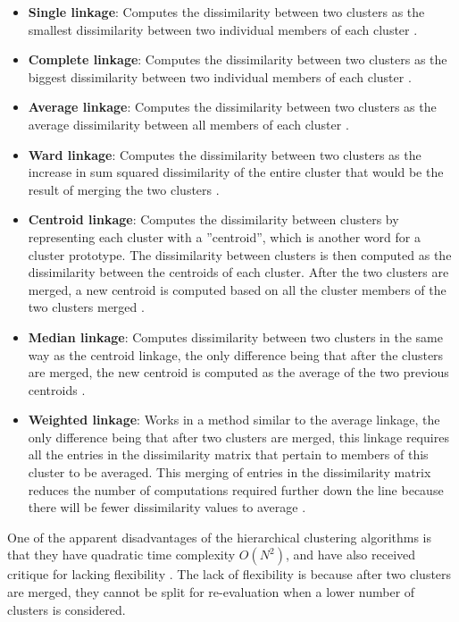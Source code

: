\begin{itemize}
    \item \textbf{Single linkage}: Computes the dissimilarity between two clusters as the smallest dissimilarity between two individual members of each cluster \cite{dependency_tsc_energy_markets}.
    \item \textbf{Complete linkage}: Computes the dissimilarity between two clusters as the biggest dissimilarity between two individual members of each cluster \cite{financial_tsc_variance_ratio}.
    \item \textbf{Average linkage}: Computes the dissimilarity between two clusters as the average dissimilarity between all members of each cluster \cite{dependency_tsc_energy_markets}.
    \item \textbf{Ward linkage}: Computes the dissimilarity between two clusters as the increase in sum squared dissimilarity of the entire cluster that would be the result of merging the two clusters \cite{copula_ica_tsc}.
    \item \textbf{Centroid linkage}: Computes the dissimilarity between clusters by representing each cluster with a ''centroid'', which is another word for a cluster prototype. The dissimilarity between clusters is then computed as the dissimilarity between the centroids of each cluster. After the two clusters are merged, a new centroid is computed based on all the cluster members of the two clusters merged \cite{scipy_hier_reference}.
    \item \textbf{Median linkage}: Computes dissimilarity between two clusters in the same way as the centroid linkage, the only difference being that after the clusters are merged, the new centroid is computed as the average of the two previous centroids \cite{scipy_hier_reference}.
    \item \textbf{Weighted linkage}: Works in a method similar to the average linkage, the only difference being that after two clusters are merged, this linkage requires all the entries in the dissimilarity matrix that pertain to members of this cluster to be averaged. This merging of entries in the dissimilarity matrix reduces the number of computations required further down the line because there will be fewer dissimilarity values to average \cite{scipy_hier_reference}.
\end{itemize}

One of the apparent disadvantages of the hierarchical clustering algorithms is that they have quadratic time complexity $O(N^2)$, and have also received critique for lacking flexibility \cite{tsc_rev}. The lack of flexibility is because after two clusters are merged, they cannot be split for re-evaluation when a lower number of clusters is considered. 

